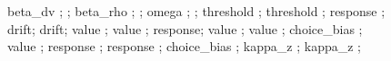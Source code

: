 \documentclass[11pt]{report}
\begin{document}
\begin{figure}[H]
{         {beta_dv} ; %
         ;
         {beta_rho} ; %
         ;
         {omega} ; %
         ;
         {threshold} ; %
         {threshold} ; %
         {response} ; %
         {drift};
         {drift};
         {value} ; %
         {value} ; %
         {response};
         {value} ;
         {value} ;
         {choice_bias} ;
         {value} ;
         {response} ;
         {response} ;
         {choice_bias} ;
         {kappa_z} ;
         {kappa_z} ;
      }
    \end{figure}
   
\end{document}
